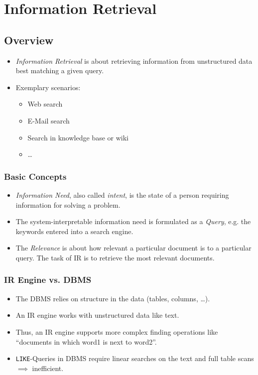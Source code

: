 \chapter{Information Retrieval} %
    \section{Overview} %
        \begin{itemize}
        	\item \textit{Information Retrieval} is about retrieving information from unstructured data best matching a given query.
        	\item Exemplary scenarios:
        		\begin{itemize}
        			\item Web search
        			\item E-Mail search
        			\item Search in knowledge base or wiki
        			\item \dots
        		\end{itemize}
        \end{itemize}

        \subsection{Basic Concepts} %
            \begin{itemize}
            	\item \textit{Information Need}, also called \textit{intent}, is the state of a person requiring information for solving a problem.
            	\item The system-interpretable information need is formulated as a \textit{Query}, e.g. the keywords entered into a search engine.
            	\item The \textit{Relevance} is about how relevant a particular document is to a particular query. The task of IR is to retrieve the most relevant documents.
            \end{itemize}

        \subsection{IR Engine vs. DBMS} %
            \begin{itemize}
            	\item The DBMS relies on structure in the data (tables, columns, \dots).
            	\item An IR engine works with unstructured data like text.
            	\item Thus, an IR engine supports more complex finding operations like \enquote{documents in which word1 is next to word2}.
            	\item \lstinline|LIKE|-Queries in DBMS require linear searches on the text and full table scans \(\implies\) inefficient.
            \end{itemize}

